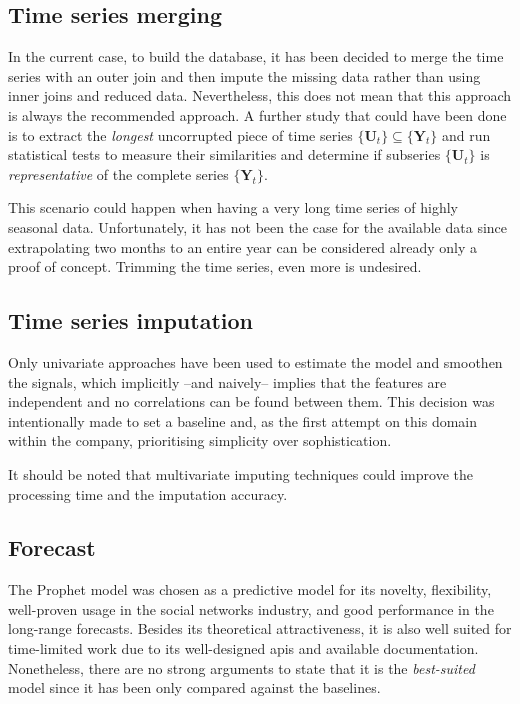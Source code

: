 \subsection{Time series merging}

In the current case, to build the database, it has been decided to merge the time series with an outer join and then impute the missing data rather than using inner joins and reduced data. Nevertheless, this does not mean that this approach is always the recommended approach. A further study that could have been done is to extract the \emph{longest} uncorrupted piece of time series $\{\bm{U}_t\} \subseteq \{\bm{Y}_t\}$ and run statistical tests to measure their similarities and determine if subseries $\{\bm{U}_t\}$ is \emph{representative} of the complete series $\{\bm{Y}_t\}$. 

This scenario could happen when having a very long time series of highly seasonal data. Unfortunately, it has not been the case for the available data since extrapolating two months to an entire year can be considered already only a proof of concept. Trimming the time series, even more is undesired.


\subsection{Time series imputation}
\label{subsec:discussion-methods-imputation}

Only univariate approaches have been used to estimate the model and smoothen the signals, which implicitly --and naively-- implies that the features are independent and no correlations can be found between them. This decision was intentionally made to set a baseline and, as the first attempt on this domain within the company, prioritising simplicity over sophistication.

It should be noted that multivariate imputing techniques could improve the processing time and the imputation accuracy.

\subsection{Forecast}

The Prophet model was chosen as a predictive model for its novelty, flexibility, well-proven usage in the social networks industry, and good performance in the long-range forecasts. Besides its theoretical attractiveness, it is also well suited for time-limited work due to its well-designed \acp{api} and available documentation. Nonetheless, there are no strong arguments to state that it is the \emph{best-suited} model since it has been only compared against the baselines. 

